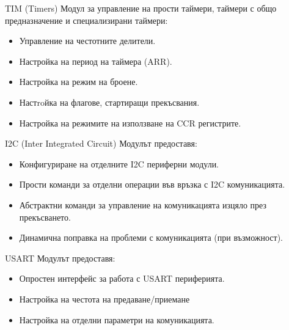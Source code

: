\documentclass[handout]{beamer}
\begin{document}
\begin{frame}[t]

	\begin{block}{TIM (Timers)}
		Модул за управление на прости таймери, таймери с общо предназначение и специализирани таймери:
		\begin{itemize}
			\item Управление на честотните делители.
			\item Настройка на период на таймера (ARR).
			\item Настройка на режим на броене.
			\item Настroйка на флагове, стартиращи прекъсвания.
			\item Настройка на режимите на използване на CCR регистрите.
		\end{itemize}
	\end{block}

\end{frame}

\begin{frame}[t]

	\begin{block}{I2C (Inter Integrated Circuit)}
		Модулът предоставя:
		\begin{itemize}
			\item Конфигуриране на отделните I2C периферни модули.
			\item Прости команди за отделни операции във връзка с I2C комуникацията.
			\item Абстрактни команди за управление на комуникацията изцяло през прекъсването.
			\item Динамична поправка на проблеми с комуникацията (при възможност).
		\end{itemize} 
	\end{block}

\end{frame}

\begin{frame}[t]

	\begin{block}{USART}
		Модулът предоставя:
		\begin{itemize}
			\item Опростен интерфейс за работа с USART периферията.
			\item Настройка на честота на предаване/приемане
			\item Настройка на отделни параметри на комуникацията.
		\end{itemize} 
	\end{block}

\end{frame}
\end{document}
